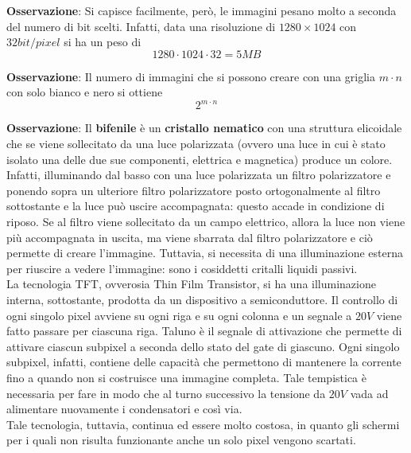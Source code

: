 \documentclass[a4paper]{extarticle}
\begin{document}
\vspace{1em}
\noindent
\textbf{Osservazione}: Si capisce facilmente, però, le immagini pesano molto a seconda del numero di bit scelti. Infatti, data una risoluzione di \(1280 \times 1024\) con \(32 bit/pixel\) si ha un peso di
\[1280 \cdot 1024 \cdot 32 = 5 MB\]

\vspace{1em}
\noindent
\textbf{Osservazione}: Il numero di immagini che si possono creare con una griglia \(m \cdot n\) con solo bianco e nero si ottiene
\[2^{m \cdot n}\]

\vspace{1em}
\noindent
\textbf{Osservazione}: Il \textbf{bifenile} è un \textbf{cristallo nematico} con una struttura elicoidale che se viene sollecitato da una luce polarizzata (ovvero una luce in cui è stato isolato una delle due sue componenti, elettrica e magnetica) produce un colore.\\
Infatti, illuminando dal basso con una luce polarizzata un filtro polarizzatore e ponendo sopra un ulteriore filtro polarizzatore posto ortogonalmente al filtro sottostante e la luce può uscire accompagnata: questo accade in condizione di riposo. Se al filtro viene sollecitato da un campo elettrico, allora la luce non viene più accompagnata in uscita, ma viene sbarrata dal filtro polarizzatore e ciò permette di creare l'immagine. Tuttavia, si necessita di una illuminazione esterna per riuscire a vedere l'immagine: sono i cosiddetti critalli liquidi passivi.\\
La tecnologia TFT, ovverosia Thin Film Transistor, si ha una illuminazione interna, sottostante, prodotta da un dispositivo a semiconduttore. Il controllo di ogni singolo pixel avviene su ogni riga e su ogni colonna e un segnale a \(20 V\) viene fatto passare per ciascuna riga. Taluno è il segnale di attivazione che permette di attivare ciascun subpixel a seconda dello stato del gate di giascuno. Ogni singolo subpixel, infatti, contiene delle capacità che permettono di mantenere la corrente fino a quando non si costruisce una immagine completa. Tale tempistica è necessaria per fare in modo che al turno successivo la tensione da \(20 V\) vada ad alimentare nuovamente i condensatori e così via.\\
Tale tecnologia, tuttavia, continua ed essere molto costosa, in quanto gli schermi per i quali non risulta funzionante anche un solo pixel vengono scartati.
\end{document}
